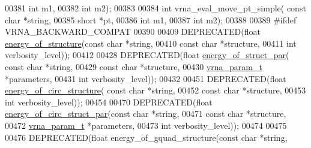 \begin{DoxyCode}
00381                       \textcolor{keywordtype}{int} m1,
00382                       \textcolor{keywordtype}{int} m2);
00383 
00384 \textcolor{keywordtype}{int} vrna\_eval\_move\_pt\_simple( \textcolor{keyword}{const} \textcolor{keywordtype}{char} *\textcolor{keywordtype}{string},
00385                               \textcolor{keywordtype}{short} *pt,
00386                               \textcolor{keywordtype}{int} m1,
00387                               \textcolor{keywordtype}{int} m2);
00388 
00389 \textcolor{preprocessor}{#ifdef VRNA\_BACKWARD\_COMPAT}
00390 
00409 DEPRECATED(\textcolor{keywordtype}{float} \hyperlink{group__eval_gaf93986cb3cb29770ec9cca69c9fab8cf}{energy\_of\_structure}(\textcolor{keyword}{const} \textcolor{keywordtype}{char} *\textcolor{keywordtype}{string},
00410                           \textcolor{keyword}{const} \textcolor{keywordtype}{char} *structure,
00411                           \textcolor{keywordtype}{int} verbosity\_level));
00412 
00428 DEPRECATED(\textcolor{keywordtype}{float} \hyperlink{group__eval_gaf9d064d3c496de42eca6734a96fd2090}{energy\_of\_struct\_par}( \textcolor{keyword}{const} \textcolor{keywordtype}{char} *\textcolor{keywordtype}{string},
00429                             \textcolor{keyword}{const} \textcolor{keywordtype}{char} *structure,
00430                             \hyperlink{group__energy__parameters_structvrna__param__s}{vrna\_param\_t} *parameters,
00431                             \textcolor{keywordtype}{int} verbosity\_level));
00432 
00451 DEPRECATED(\textcolor{keywordtype}{float} \hyperlink{group__eval_gaeb14f3664aec67fc03268ac75253f0f8}{energy\_of\_circ\_structure}( \textcolor{keyword}{const} \textcolor{keywordtype}{char} *\textcolor{keywordtype}{string},
00452                                 \textcolor{keyword}{const} \textcolor{keywordtype}{char} *structure,
00453                                 \textcolor{keywordtype}{int} verbosity\_level));
00454 
00470 DEPRECATED(\textcolor{keywordtype}{float} \hyperlink{group__eval_ga3f01f9744ba6a40555eb4d81fc77f6df}{energy\_of\_circ\_struct\_par}(\textcolor{keyword}{const} \textcolor{keywordtype}{char} *\textcolor{keywordtype}{string},
00471                                 \textcolor{keyword}{const} \textcolor{keywordtype}{char} *structure,
00472                                 \hyperlink{group__energy__parameters_structvrna__param__s}{vrna\_param\_t} *parameters,
00473                                 \textcolor{keywordtype}{int} verbosity\_level));
00474 
00475 
00476 DEPRECATED(\textcolor{keywordtype}{float} energy\_of\_gquad\_structure(\textcolor{keyword}{const} \textcolor{keywordtype}{char} *\textcolor{keywordtype}{string},

\end{DoxyCode}
